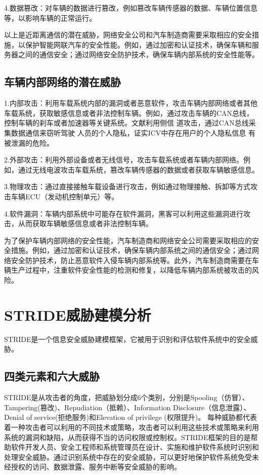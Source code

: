 4.数据篡改：对车辆的数据进行篡改，例如篡改车辆传感器的数据、车辆位置信息等，以影响车辆的正常运行。

以上是近距离通信的潜在威胁，网络安全公司和汽车制造商需要采取相应的安全措施，以保护智能网联汽车的安全性能。例如，通过加密和认证技术，确保车辆和服务器之间的通信安全；通过网络安全防护技术，确保车辆内部系统的安全性能等。

\subsection{车辆内部网络的潜在威胁}
1.内部攻击：利用车载系统内部的漏洞或者恶意软件，攻击车辆内部网络或者其他车载系统，获取敏感信息或者非法控制车辆。例如，通过攻击车辆的CAN总线，控制车辆的刹车或者加速器等关键系统。文献\cite{koscher2010experimental}利用侧信
道攻击，通过CAN总线采集数据通信来窃听驾驶
人员的个人隐私，证实ICV中存在用户的个人隐私信息
有被泄漏的危险。

2.外部攻击：利用外部设备或者无线信号，攻击车载系统或者车辆内部网络。例如，通过无线电波攻击车载系统，篡改车辆传感器的数据或者获取车辆敏感信息。

3.物理攻击：通过直接接触车载设备进行攻击，例如通过物理接触、拆卸等方式攻击车辆ECU（发动机控制单元）等。

4.软件漏洞：车辆内部系统中可能存在软件漏洞，黑客可以利用这些漏洞进行攻击，从而获取车辆敏感信息或者非法控制车辆。

为了保护车辆内部网络的安全性能，汽车制造商和网络安全公司需要采取相应的安全措施。例如，通过加密和认证技术，确保车辆内部系统之间的通信安全；通过网络安全防护技术，防止恶意软件入侵车辆内部系统等。此外，汽车制造商需要在车辆生产过程中，注重软件安全性能的检测和修复，以降低车辆内部系统被攻击的风险。


\section{STRIDE威胁建模分析}
STRIDE是一个信息安全威胁建模框架，它被用于识别和评估软件系统中的安全威胁。  
\subsection{四类元素和六大威胁}

STRIDE是从攻击者的角度，把威胁划分成6个类别，分别是Spooling（仿冒）、Tampering(篡改)、Repudiation（抵赖）、Information Disclosure（信息泄露）、Denial of service(拒绝服务)和Elevation of privilege (权限提升)。
每种威胁都代表着一种攻击者可以利用的不同技术或策略，攻击者可以利用这些技术或策略来利用系统的漏洞和缺陷，从而获得不当的访问权限或控制权。STRIDE框架的目的是帮助软件开发人员、安全工程师和系统管理员在设计、实施和维护软件系统时识别和处理安全威胁。通过识别系统中存在的安全威胁，可以更好地保护软件系统免受未经授权的访问、数据泄露、服务中断等安全威胁的影响。

